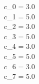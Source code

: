 c_0 = 3.0 \\
c_1 = 5.0 \\
c_2 = 3.0 \\
c_3 = 5.0 \\
c_4 = 3.0 \\
c_5 = 5.0 \\
c_6 = 3.0 \\
c_7 = 5.0 \\
